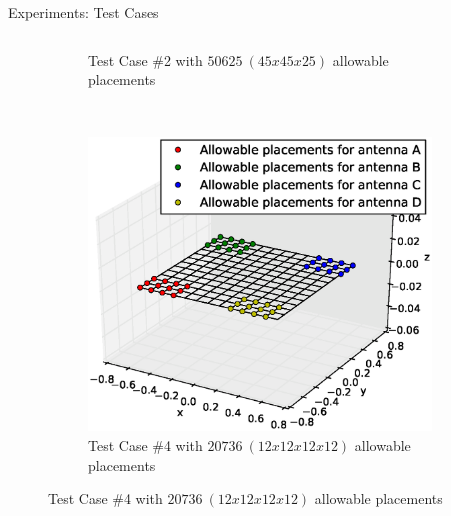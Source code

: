 \documentclass{beamer}
\begin{document}
\begin{frame}{Experiments: Test Cases}
\begin{columns}
\begin{column}{.5\columnwidth}
\begin{figure}
\begin{subfigure}{\columnwidth}
                    \caption*{\tiny Test Case \#2 with $50625~(45x45x25)$ allowable placements}%
                \end{subfigure}\hfill\\%
                \begin{subfigure}{\columnwidth}
                    \includegraphics[trim=0 30 0 50, clip, scale=0.25]{../paper/FIG/tc4_figure}%
                    \caption*{\tiny Test Case \#4 with $20736~(12x12x12x12)$ allowable placements}%
                \end{subfigure}\hfill%
            \end{figure}
        \end{column}
    \end{columns}
\end{frame}
\end{document}
